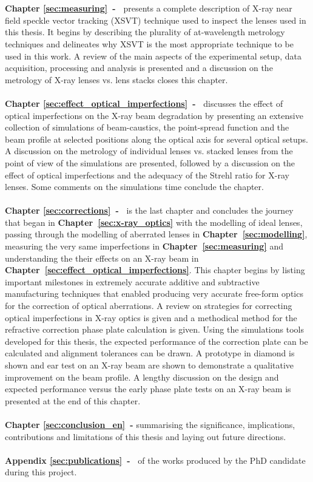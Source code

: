 \\
\\
\textbf{Chapter \ref{sec:measuring}~-~} presents a complete description of X-ray near field speckle vector tracking (XSVT) technique used to inspect the lenses used in this thesis. It begins by describing the plurality of at-wavelength metrology techniques and delineates why XSVT is the most appropriate technique to be used in this work. A review of the main aspects of the experimental setup,  data acquisition, processing and analysis is presented and a discussion on the metrology of X-ray lenses vs. lens stacks closes this chapter.
\\
\\
\textbf{Chapter \ref{sec:effect_optical_imperfections}~-~} discusses the effect of optical imperfections on the X-ray beam degradation by presenting an extensive collection of simulations of beam-caustics, the point-spread function and the beam profile at selected positions along the optical axis for several optical setups. A discussion on the metrology of individual lenses vs. stacked lenses from the point of view of the simulations are presented, followed by a discussion on the effect of optical imperfections and the adequacy of the Strehl ratio for X-ray lenses. Some comments on the simulations time conclude the chapter.
\\
\\
\textbf{Chapter \ref{sec:corrections}~-~} is the last chapter and concludes the journey that began in \textbf{Chapter~\ref{sec:x-ray_optics}} with the modelling of ideal lenses, passing through the modelling of aberrated lenses in \textbf{Chapter~\ref{sec:modelling}}, measuring the very same imperfections in \textbf{Chapter~\ref{sec:measuring}} and understanding the their effects on an X-ray beam in \textbf{Chapter~\ref{sec:effect_optical_imperfections}}. This chapter begins by listing important milestones in extremely accurate additive and subtractive manufacturing techniques that enabled producing very accurate free-form optics for the correction of optical aberrations. A review on strategies for correcting optical imperfections in X-ray optics is given and a methodical method for the refractive correction phase plate calculation is given. Using the simulations tools developed for this thesis, the expected performance of the correction plate can be calculated and alignment tolerances can be drawn. A prototype in diamond is shown and ear test on an X-ray beam are shown to demonstrate a qualitative improvement on the beam profile. A lengthy discussion on the design and expected performance versus the early phase plate tests on an X-ray beam is presented at the end of this chapter.
\\
\\
\textbf{Chapter \ref{sec:conclusion_en}~-} summarising the significance, implications, contributions and limitations of this thesis and laying out future directions.
\\
\\
\textbf{Appendix \ref{sec:publications}~-~} of the works produced by the PhD candidate during this project.